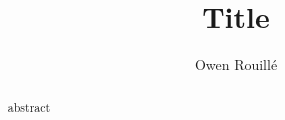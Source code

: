 \documentclass{llncs}
\begin{document}
\title{Title}

\author{Owen Rouill\'e}

\institute{}

\maketitle

\begin{abstract}
abstract
\end{abstract}










\printbibliography
\end{document}
